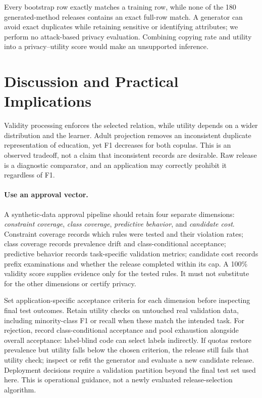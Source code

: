 \documentclass{svproc}
\begin{document}
Every bootstrap row exactly matches a training row, while none of the 180 generated-method releases contains an exact full-row match. A generator can avoid exact duplicates while retaining sensitive or identifying attributes; we perform no attack-based privacy evaluation. Combining copying rate and utility into a privacy--utility score would make an unsupported inference.
\FloatBarrier

\section{Discussion and Practical Implications}
Validity processing enforces the selected relation, while utility depends on a wider distribution and the learner. Adult projection removes an inconsistent duplicate representation of education, yet F1 decreases for both copulas. This is an observed tradeoff, not a claim that inconsistent records are desirable. Raw release is a diagnostic comparator, and an application may correctly prohibit it regardless of F1.

\paragraph{Use an approval vector.}
A synthetic-data approval pipeline should retain four separate dimensions: \emph{constraint coverage}, \emph{class coverage}, \emph{predictive behavior}, and \emph{candidate cost}. Constraint coverage records which rules were tested and their violation rates; class coverage records prevalence drift and class-conditional acceptance; predictive behavior records task-specific validation metrics; candidate cost records prefix examinations and whether the release completed within its cap. A 100\% validity score supplies evidence only for the tested rules. It must not substitute for the other dimensions or certify privacy.

Set application-specific acceptance criteria for each dimension before inspecting final test outcomes. Retain utility checks on untouched real validation data, including minority-class F1 or recall when these match the intended task. For rejection, record class-conditional acceptance and pool exhaustion alongside overall acceptance: label-blind code can select labels indirectly. If quotas restore prevalence but utility falls below the chosen criterion, the release still fails that utility check; inspect or refit the generator and evaluate a new candidate release. Deployment decisions require a validation partition beyond the final test set used here. This is operational guidance, not a newly evaluated release-selection algorithm.
\end{document}
